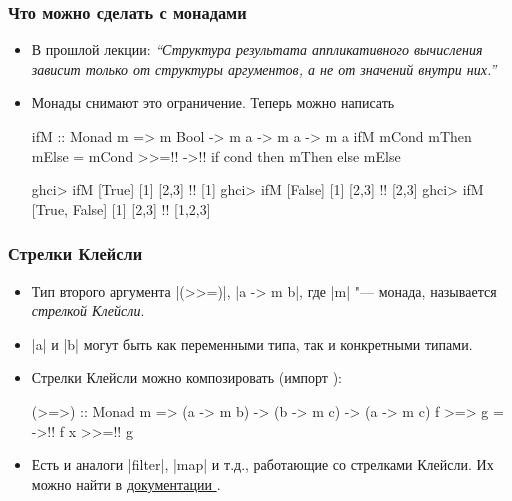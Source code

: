 \documentclass[11pt]{beamer}
\begin{document}
\begin{frame}[fragile]
  \frametitle{Что можно сделать с монадами}
  \begin{itemize}
    \item В прошлой лекции:
          \emph{\enquote{Структура результата аппликативного вычисления зависит только от структуры аргументов, а не от значений внутри них.}}
    \item Монады снимают это ограничение. Теперь можно написать
          \begin{haskellsmall}
            ifM :: Monad m => m Bool -> m a -> m a -> m a
            ifM mCond mThen mElse =
              mCond >>=!\pause! \cond ->!\pause!
                if cond then mThen else mElse
          \end{haskellsmall}
          \begin{haskellsmall}
            ghci> ifM [True] [1] [2,3] !\pause!
            [1]
            ghci> ifM [False] [1] [2,3] !\pause!
            [2,3]
            ghci> ifM [True, False] [1] [2,3] !\pause!
            [1,2,3]
          \end{haskellsmall}
  \end{itemize}
\end{frame}


\begin{frame}[fragile]
  \frametitle{Стрелки Клейсли}
  \begin{itemize}
    \item Тип второго аргумента \haskinline|(>>=)|, \haskinline|a -> m b|, где \haskinline|m| "--- монада, называется \emph{стрелкой Клейсли}.
    \item \haskinline|a| и \haskinline|b| могут быть как переменными типа, так и конкретными типами.
    \item Стрелки Клейсли можно композировать (импорт \href{https://hackage.haskell.org/package/base/docs/Control-Monad.html}{}):
          \begin{haskellsmall}
            (>=>) :: Monad m => (a -> m b) -> (b -> m c) ->
                                (a -> m c)
            f >=> g = \x ->!\pause! f x >>=!\pause! g
          \end{haskellsmall}
    \item Есть и аналоги \haskinline|filter|, \haskinline|map| и т.д., работающие со стрелками Клейсли. Их можно найти в \href{https://hackage.haskell.org/package/base/docs/Control-Monad.html}{документации }.
  \end{itemize}
\end{frame}
\end{document}

